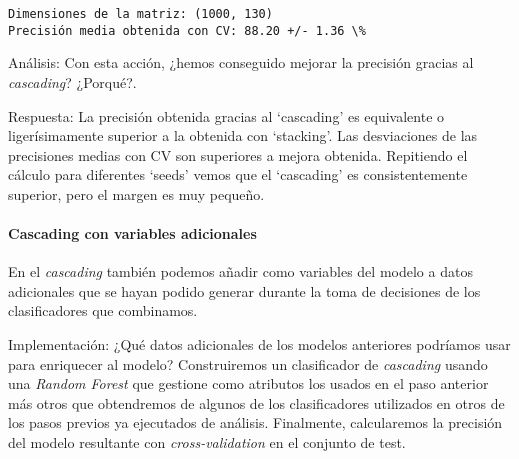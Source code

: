 \documentclass[11pt]{article}
\begin{document}
    \begin{Verbatim}[commandchars=\\\{\}]
Dimensiones de la matriz: (1000, 130)
Precisión media obtenida con CV: 88.20 +/- 1.36 \%

    \end{Verbatim}

    Análisis: Con esta acción, ¿hemos conseguido mejorar la precisión
gracias al \emph{cascading}? ¿Porqué?.

    Respuesta: La precisión obtenida gracias al `cascading' es equivalente o
ligerísimamente superior a la obtenida con `stacking'. Las desviaciones
de las precisiones medias con CV son superiores a mejora obtenida.
Repitiendo el cálculo para diferentes `seeds' vemos que el `cascading'
es consistentemente superior, pero el margen es muy pequeño.

    \hypertarget{cascading-con-variables-adicionales}{%
\paragraph{Cascading con variables
adicionales}\label{cascading-con-variables-adicionales}}

    En el \emph{cascading} también podemos añadir como variables del modelo
a datos adicionales que se hayan podido generar durante la toma de
decisiones de los clasificadores que combinamos.

    Implementación: ¿Qué datos adicionales de los modelos anteriores
podríamos usar para enriquecer al modelo? Construiremos un clasificador
de \emph{cascading} usando una \emph{Random Forest} que gestione como
atributos los usados en el paso anterior más otros que obtendremos de
algunos de los clasificadores utilizados en otros de los pasos previos
ya ejecutados de análisis. Finalmente, calcularemos la precisión del
modelo resultante con \emph{cross-validation} en el conjunto de test.
\end{document}
